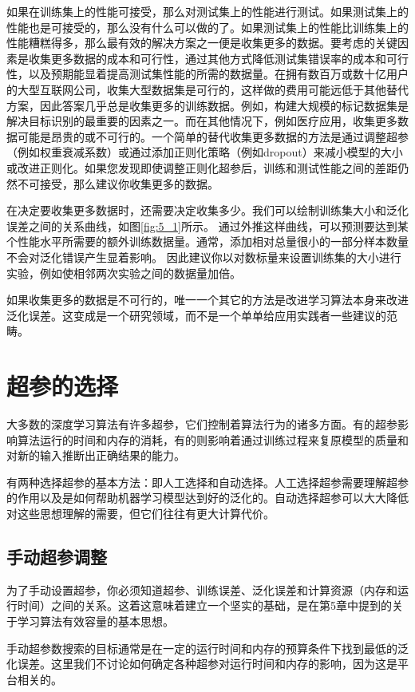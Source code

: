 如果在训练集上的性能可接受，那么对测试集上的性能进行测试。如果测试集上的性能也是可接受的，那么没有什么可以做的了。如果测试集上的性能比训练集上的性能糟糕得多，那么最有效的解决方案之一便是收集更多的数据。要考虑的关键因素是收集更多数据的成本和可行性，通过其他方式降低测试集错误率的成本和可行性，以及预期能显着提高测试集性能的所需的数据量。在拥有数百万或数十亿用户的大型互联网公司，收集大型数据集是可行的，这样做的费用可能远低于其他替代方案，因此答案几乎总是收集更多的训练数据。例如，构建大规模的标记数据集是解决目标识别的最重要的因素之一。而在其他情况下，例如医疗应用，收集更多数据可能是昂贵的或不可行的。一个简单的替代收集更多数据的方法是通过调整超参（例如权重衰减系数）或通过添加正则化策略（例如dropout）来减小模型的大小或改进正则化。如果您发现即使调整正则化超参后，训练和测试性能之间的差距仍然不可接受，那么建议你收集更多的数据。

在决定要收集更多数据时，还需要决定收集多少。我们可以绘制训练集大小和泛化误差之间的关系曲线，如图\ref{fig:5_1}所示。 通过外推这样曲线，可以预测要达到某个性能水平所需要的额外训练数据量。通常，添加相对总量很小的一部分样本数量不会对泛化错误产生显着影响。 因此建议你以对数标量来设置训练集的大小进行实验，例如使相邻两次实验之间的数据量加倍。

如果收集更多的数据是不可行的，唯一一个其它的方法是改进学习算法本身来改进泛化误差。这变成是一个研究领域，而不是一个单单给应用实践者一些建议的范畴。

\section{超参的选择}

大多数的深度学习算法有许多超参，它们控制着算法行为的诸多方面。有的超参影响算法运行的时间和内存的消耗，有的则影响着通过训练过程来复原模型的质量和对新的输入推断出正确结果的能力。

有两种选择超参的基本方法：即人工选择和自动选择。人工选择超参需要理解超参的作用以及是如何帮助机器学习模型达到好的泛化的。自动选择超参可以大大降低对这些思想理解的需要，但它们往往有更大计算代价。


\subsection{手动超参调整}

为了手动设置超参，你必须知道超参、训练误差、泛化误差和计算资源（内存和运行时间）之间的关系。这着这意味着建立一个坚实的基础，是在第5章中提到的关于学习算法有效容量的基本思想。

手动超参数搜索的目标通常是在一定的运行时间和内存的预算条件下找到最低的泛化误差。这里我们不讨论如何确定各种超参对运行时间和内存的影响，因为这是平台相关的。


